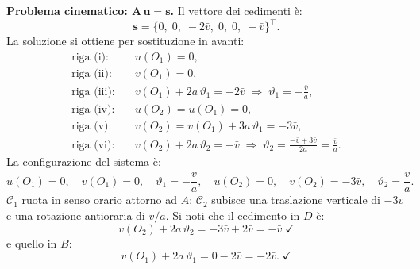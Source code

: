 \begin{esempio}
\begin{svolgimento}
		\smallskip
		\noindent\textbf{Problema cinematico:
			$\bm{A}\,\bm{u} = \bm{s}$.}
		Il vettore dei cedimenti è:
		\begin{equation*}
			\bm{s} =
			\bigl\{0,\; 0,\; -2\bar{v},\;
			0,\; 0,\; -\bar{v}
			\bigr\}^\top.
		\end{equation*}
		La soluzione si ottiene per sostituzione in avanti:
		\begin{align*}
			\text{riga (i):}&\quad u(O_1) = 0,\\
			\text{riga (ii):}&\quad v(O_1) = 0,\\
			\text{riga (iii):}&\quad
			v(O_1) + 2a\,\vartheta_1 = -2\bar{v}
			\;\Longrightarrow\;
			\vartheta_1 = -\frac{\bar{v}}{a},\\
			\text{riga (iv):}&\quad
			u(O_2) = u(O_1) = 0,\\
			\text{riga (v):}&\quad
			v(O_2) = v(O_1) + 3a\,\vartheta_1
			= -3\bar{v},\\
			\text{riga (vi):}&\quad
			v(O_2) + 2a\,\vartheta_2 = -\bar{v}
			\;\Longrightarrow\;
			\vartheta_2 = \frac{-\bar{v} + 3\bar{v}}{2a}
			= \frac{\bar{v}}{a}.
		\end{align*}
		La configurazione del sistema è:
		\begin{equation*}
			u(O_1) = 0, \quad
			v(O_1) = 0, \quad
			\vartheta_1 = -\frac{\bar{v}}{a},
			\quad
			u(O_2) = 0, \quad
			v(O_2) = -3\bar{v}, \quad
			\vartheta_2 = \frac{\bar{v}}{a}.
		\end{equation*}
		$\mathcal{C}_1$ ruota in senso orario attorno ad $A$;
		$\mathcal{C}_2$ subisce una traslazione verticale di
		$-3\bar{v}$ e una rotazione antioraria di $\bar{v}/a$.
		Si noti che il cedimento in $D$ è:
		\begin{equation*}
			v(O_2) + 2a\,\vartheta_2 =
			-3\bar{v} + 2\bar{v} = -\bar{v} \;\checkmark
		\end{equation*}
		e quello in $B$:
		\begin{equation*}
			v(O_1) + 2a\,\vartheta_1 =
			0 - 2\bar{v} = -2\bar{v}. \;\checkmark
		\end{equation*}
		

\end{svolgimento}
\end{esempio}
